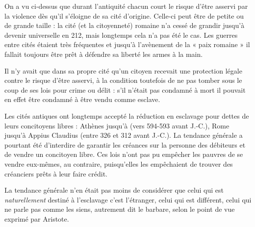 On a vu ci-dessus que durant l'antiquité chacun court le risque
d'être asservi par la violence dès qu'il s'éloigne de sa cité d'origine. Celle-ci
peut être de petite ou de grande taille : la cité (et la citoyenneté) romaine
n'a cessé de grandir jusqu'à devenir universelle en 212, mais longtemps
cela n'a pas été le cas. Les guerres entre cités étaient très fréquentes
et jusqu'à l'avènement de la « paix romaine » il fallait toujours être prêt
à défendre sa liberté les armes à la main.

Il n'y avait que dans sa propre cité qu'un citoyen recevait une protection
légale contre le risque d'être asservi, à la condition toutefois de ne
pas tomber sous le coup de ses lois pour crime ou délit : s'il n'était pas
condamné à mort il pouvait en effet être condamné à être vendu comme
esclave.

Les cités antiques ont longtemps accepté la réduction en esclavage
pour dettes de leurs concitoyens libres : Athènes jusqu'à  (vers
594-593 avant J.-C.), Rome jusqu'à \hbox{Appius} Claudius  (entre 326 et 312
avant J.-C.). La tendance générale
 a pourtant été d'interdire de garantir
les créances sur la personne des débiteurs et de vendre un concitoyen libre.
Ces lois n'ont pas pu empêcher les pauvres de se vendre eux-mêmes,
au contraire, puisqu'elles les empêchaient de trouver des créanciers prêts
à leur faire crédit.

La tendance générale%
n'en était pas moins de considérer que celui
qui est \emph{naturellement} destiné à l'esclavage c'est l'étranger, celui qui est différent,
celui qui ne parle pas comme les siens, autrement dit le barbare, selon
le point de vue exprimé par Aristote.